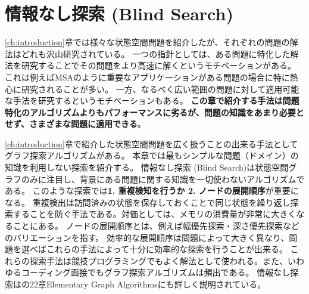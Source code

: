 \chapter{情報なし探索 (Blind Search)}
\label{ch:blind-search}

\ref{ch:introduction}章では様々な状態空間問題を紹介したが、それぞれの問題の解法はどれも沢山研究されている。
一つの指針としては、ある問題に特化した解法を研究することでその問題をより高速に解くというモチベーションがある。
これは例えばMSAのように重要なアプリケーションがある問題の場合に特に熱心に研究されることが多い。
一方、なるべく広い範囲の問題に対して適用可能な手法を研究するというモチベーションもある。
{\bf この章で紹介する手法は問題特化のアルゴリズムよりもパフォーマンスに劣るが、問題の知識をあまり必要とせず、さまざまな問題に適用できる}。

\ref{ch:introduction}章で紹介した状態空間問題を広く扱うことの出来る手法としてグラフ探索アルゴリズムがある。
本章では最もシンプルな問題（ドメイン）の知識を利用しない探索を紹介する。
情報なし探索 (Blind Search)は状態空間グラフのみに注目し、背景にある問題に関する知識を一切使わないアルゴリズムである。
このような探索では{\bf 1. 重複検知を行うか 2. ノードの展開順序}が重要になる。
重複検出は訪問済みの状態を保存しておくことで同じ状態を繰り返し探索することを防ぐ手法である。対価としては、メモリの消費量が非常に大きくなることにある。
ノードの展開順序とは、例えば幅優先探索・深さ優先探索などのバリエーションを指す。
効率的な展開順序は問題によって大きく異なり、問題を選べばこれらの手法によって十分に効率的な探索を行うことが出来る。
これらの探索手法は競技プログラミングでもよく解法として使われる\cite{skiena2006programming}。また、いわゆるコーディング面接でもグラフ探索アルゴリズムは頻出である\cite{mcdowell2011cracking}。
情報なし探索は\cite{cormen01}の22章Elementary Graph Algorithmsにも詳しく説明されている。

